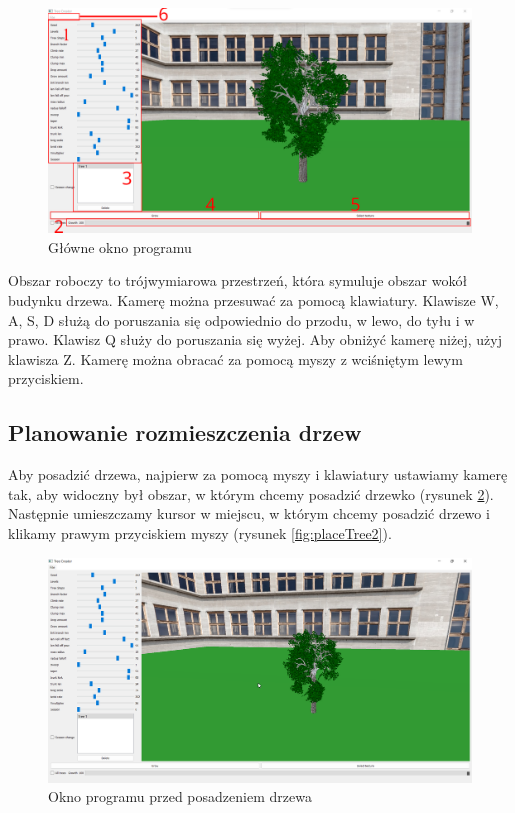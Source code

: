 \documentclass[a4paper,twoside,12pt]{report}
\begin{document}
\begin{figure}[H]
	\centering\includegraphics[width=15.5cm]{grafika/program/main2.png}
	\caption{Główne okno programu}
    \label{fig:screenmainwindow}
\end{figure}

Obszar roboczy to trójwymiarowa przestrzeń, która symuluje obszar 
wokół budynku drzewa. Kamerę można przesuwać za pomocą klawiatury. 
Klawisze W, A, S, D służą do poruszania się odpowiednio do przodu, 
w lewo, do tyłu i w prawo. Klawisz Q służy do poruszania się wyżej. 
Aby obniżyć kamerę niżej, użyj klawisza Z. 
Kamerę można obracać za pomocą myszy z wciśniętym lewym przyciskiem.  


\subsection{Planowanie rozmieszczenia drzew}

Aby posadzić drzewa, najpierw za pomocą myszy i klawiatury 
ustawiamy kamerę tak, aby widoczny był obszar, w którym chcemy 
posadzić drzewko (rysunek \ref{fig:placeTree}). Następnie umieszczamy kursor w miejscu, w którym 
chcemy posadzić drzewo i klikamy prawym przyciskiem myszy (rysunek \ref{fig:placeTree2}).


\begin{figure}[H]
	\centering\includegraphics[width=15.5cm]{grafika/program/placeTree.png}
	\caption{Okno programu przed posadzeniem drzewa}
    \label{fig:placeTree}
\end{figure}
\end{document}

